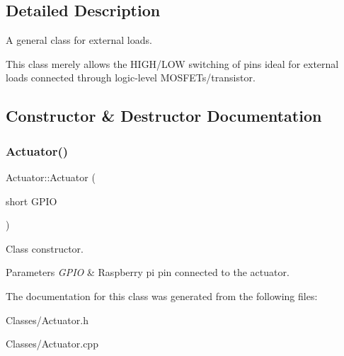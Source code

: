 \subsection{Detailed Description}
A general class for external loads. 

This class merely allows the H\+I\+G\+H/\+L\+OW switching of pins ideal for external loads connected through logic-\/level M\+O\+S\+F\+E\+Ts/transistor. 

\subsection{Constructor \& Destructor Documentation}
\mbox{\label{classActuator_a8323c15d7ca85370d2760cbcaba7cb07}} 
\subsubsection{\texorpdfstring{Actuator()}{Actuator()}}
{\footnotesize\ttfamily Actuator\+::\+Actuator (\begin{DoxyParamCaption}\item[{short}]{G\+P\+IO }\end{DoxyParamCaption})}



Class constructor. 


\begin{DoxyParams}{Parameters}
{\em G\+P\+IO} & Raspberry pi pin connected to the actuator. \\
\hline
\end{DoxyParams}


The documentation for this class was generated from the following files\+:\begin{DoxyCompactItemize}
\item 
Classes/Actuator.\+h\item 
Classes/Actuator.\+cpp\end{DoxyCompactItemize}

